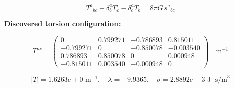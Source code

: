 
\begin{equation}
  T^a{}_{bc} + \delta^a_b T_c - \delta^a_c T_b = 8\pi G \, s^a{}_{bc}
\end{equation}

\textbf{Discovered torsion configuration:}

\begin{equation}
  T^{\mu\nu} = \begin{pmatrix}
    0 & 0.799271 & -0.786893 & 0.815011 \\
    -0.799271 & 0 & -0.850078 & -0.003540 \\
    0.786893 & 0.850078 & 0 & 0.000948 \\
    -0.815011 & 0.003540 & -0.000948 & 0
  \end{pmatrix} \quad \text{m}^{-1}
\end{equation}

\begin{equation}
  |T| = 1.6263e+0 \text{ m}^{-1}, \quad
  \lambda = -9.9365, \quad
  \sigma = 2.8892e-3 \text{ J}\cdot\text{s/m}^3
\end{equation}